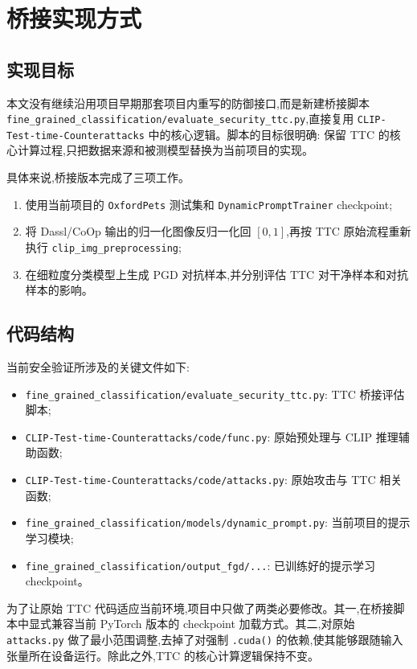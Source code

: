 \section{桥接实现方式}

\subsection{实现目标}

本文没有继续沿用项目早期那套项目内重写的防御接口,而是新建桥接脚本 \texttt{fine\_grained\_classification/evaluate\_security\_ttc.py},直接复用 \texttt{CLIP-Test-time-Counterattacks} 中的核心逻辑。脚本的目标很明确: 保留 TTC 的核心计算过程,只把数据来源和被测模型替换为当前项目的实现。

具体来说,桥接版本完成了三项工作。

\begin{enumerate}
\item 使用当前项目的 \texttt{OxfordPets} 测试集和 \texttt{DynamicPromptTrainer} checkpoint;
\item 将 Dassl/CoOp 输出的归一化图像反归一化回 \([0,1]\),再按 TTC 原始流程重新执行 \texttt{clip\_img\_preprocessing};
\item 在细粒度分类模型上生成 PGD 对抗样本,并分别评估 TTC 对干净样本和对抗样本的影响。
\end{enumerate}

\subsection{代码结构}

当前安全验证所涉及的关键文件如下:

\begin{itemize}
\item \texttt{fine\_grained\_classification/evaluate\_security\_ttc.py}: TTC 桥接评估脚本;
\item \texttt{CLIP-Test-time-Counterattacks/code/func.py}: 原始预处理与 CLIP 推理辅助函数;
\item \texttt{CLIP-Test-time-Counterattacks/code/attacks.py}: 原始攻击与 TTC 相关函数;
\item \texttt{fine\_grained\_classification/models/dynamic\_prompt.py}: 当前项目的提示学习模块;
\item \texttt{fine\_grained\_classification/output\_fgd/...}: 已训练好的提示学习 checkpoint。
\end{itemize}

为了让原始 TTC 代码适应当前环境,项目中只做了两类必要修改。其一,在桥接脚本中显式兼容当前 PyTorch 版本的 checkpoint 加载方式。其二,对原始 \texttt{attacks.py} 做了最小范围调整,去掉了对强制 \texttt{.cuda()} 的依赖,使其能够跟随输入张量所在设备运行。除此之外,TTC 的核心计算逻辑保持不变。

